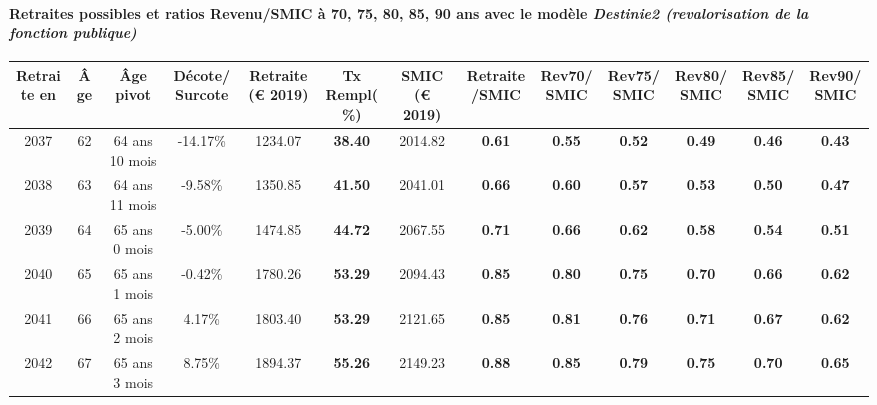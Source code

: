 \paragraph{Retraites possibles et ratios Revenu/SMIC à 70, 75, 80, 85, 90 ans avec le modèle \emph{Destinie2 (revalorisation de la fonction publique)}}  
 
{ \scriptsize \begin{center} 
\begin{tabular}[htb]{|c|c||c|c||c|c||c||c|c|c|c|c|c|} 
\hline 
 Retraite en &  Âge &  Âge pivot &  Décote/Surcote &  Retraite (\euro{} 2019) &  Tx Rempl(\%) &  SMIC (\euro{} 2019) &  Retraite/SMIC &  Rev70/SMIC &  Rev75/SMIC &  Rev80/SMIC &  Rev85/SMIC &  Rev90/SMIC \\ 
\hline \hline 
 2037 &  62 &  64 ans 10 mois &  -14.17\% &  1234.07 &  {\bf 38.40} &  2014.82 &  {\bf {\color{red} 0.61}} &  {\bf {\color{red} 0.55}} &  {\bf {\color{red} 0.52}} &  {\bf {\color{red} 0.49}} &  {\bf {\color{red} 0.46}} &  {\bf {\color{red} 0.43}} \\ 
\hline 
 2038 &  63 &  64 ans 11 mois &  -9.58\% &  1350.85 &  {\bf 41.50} &  2041.01 &  {\bf {\color{red} 0.66}} &  {\bf {\color{red} 0.60}} &  {\bf {\color{red} 0.57}} &  {\bf {\color{red} 0.53}} &  {\bf {\color{red} 0.50}} &  {\bf {\color{red} 0.47}} \\ 
\hline 
 2039 &  64 &  65 ans 0 mois &  -5.00\% &  1474.85 &  {\bf 44.72} &  2067.55 &  {\bf {\color{red} 0.71}} &  {\bf {\color{red} 0.66}} &  {\bf {\color{red} 0.62}} &  {\bf {\color{red} 0.58}} &  {\bf {\color{red} 0.54}} &  {\bf {\color{red} 0.51}} \\ 
\hline 
 2040 &  65 &  65 ans 1 mois &  -0.42\% &  1780.26 &  {\bf 53.29} &  2094.43 &  {\bf {\color{red} 0.85}} &  {\bf {\color{red} 0.80}} &  {\bf {\color{red} 0.75}} &  {\bf {\color{red} 0.70}} &  {\bf {\color{red} 0.66}} &  {\bf {\color{red} 0.62}} \\ 
\hline 
 2041 &  66 &  65 ans 2 mois &  4.17\% &  1803.40 &  {\bf 53.29} &  2121.65 &  {\bf {\color{red} 0.85}} &  {\bf {\color{red} 0.81}} &  {\bf {\color{red} 0.76}} &  {\bf {\color{red} 0.71}} &  {\bf {\color{red} 0.67}} &  {\bf {\color{red} 0.62}} \\ 
\hline 
 2042 &  67 &  65 ans 3 mois &  8.75\% &  1894.37 &  {\bf 55.26} &  2149.23 &  {\bf {\color{red} 0.88}} &  {\bf {\color{red} 0.85}} &  {\bf {\color{red} 0.79}} &  {\bf {\color{red} 0.75}} &  {\bf {\color{red} 0.70}} &  {\bf {\color{red} 0.65}} \\ 
\hline 
\hline 
\end{tabular} 
\end{center} } 

